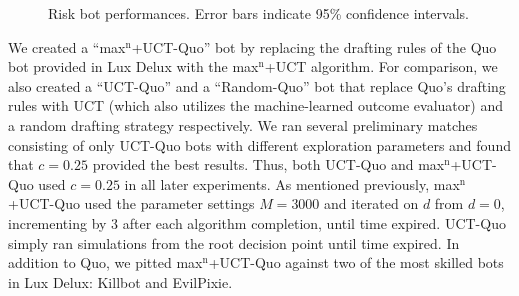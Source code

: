 \documentclass[letterpaper]{article}
\numberwithin{equation}{section}
\numberwithin{theorem}{section}
\numberwithin{lemma}{section}
\numberwithin{df}{section}
\begin{document}
\begin{figure}[t]
	\caption[]{Risk bot performances.  Error bars indicate 95\% confidence intervals.}
	\label{fig:RiskResults}
\end{figure}

We created a ``max$^\text{n}$+UCT-Quo'' bot by replacing the drafting rules of the Quo bot provided in Lux Delux with the max$^\text{n}$+UCT algorithm.  For comparison, we also created a ``UCT-Quo''  and a ``Random-Quo'' bot that replace Quo's drafting rules with UCT (which also utilizes the machine-learned outcome evaluator) and a random drafting strategy respectively.  We ran several preliminary matches consisting of only UCT-Quo bots with different exploration parameters and found that $c=0.25$ provided the best results.  Thus, both UCT-Quo and max$^\text{n}$+UCT-Quo used $c=0.25$ in all later experiments.  As mentioned previously, max$^\text{n}$+UCT-Quo used the parameter settings $M = 3000$ and iterated on $d$ from $d=0$, incrementing by 3 after each algorithm completion, until time expired.  UCT-Quo simply ran simulations from the root decision point until time expired.  In addition to Quo, we pitted max$^\text{n}$+UCT-Quo against two of the most skilled bots in Lux Delux: Killbot and EvilPixie.   
\end{document}
